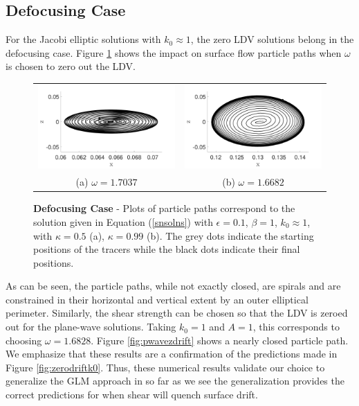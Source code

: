 \documentclass{JFM_Style/jfm}
\begin{document}
\subsection{Defocusing Case}

For the Jacobi elliptic solutions with $k_{0}\approx 1$, the zero LDV solutions belong in the defocusing case.  Figure \ref{fig:jaczerodrift} shows the impact on surface flow particle paths when $\omega$ is chosen to zero out the LDV.
\begin{figure}
\centering
\begin{tabular}{cc}
\includegraphics[width=.48\textwidth]{track_ep_pt1_tf_1_w_1pt704_kap_pt5_foc} & \includegraphics[width=.48\textwidth]{track_ep_pt1_tf_1_w_1pt668_kap_pt99_foc} \\
(a) $\omega=1.7037$ & (b) $\omega=1.6682$ 
\end{tabular}
\caption{\small {\bf Defocusing Case} - Plots of particle paths correspond to the solution given in Equation (\ref{snsolns}) with $\epsilon=0.1$, $\beta=1$, $k_{0}\approx 1$, with $\kappa=0.5$  (a), $\kappa=0.99$ (b). The grey dots indicate the starting positions of the tracers while the black dots indicate their final positions.  }
\label{fig:jaczerodrift}
\end{figure}
As can be seen, the particle paths, while not exactly closed, are spirals and are constrained in their horizontal and vertical extent by an outer elliptical perimeter.  Similarly, the shear strength can be chosen so that the LDV is zeroed out for the plane-wave solutions.  Taking $k_{0}=1$ and $A=1$, this corresponds to choosing $\omega = 1.6828$.  Figure \ref{fig:pwavezdrift} shows a nearly closed particle path.  We emphasize that these results are a confirmation of the predictions made in Figure \ref{fig:zerodriftk0}.  Thus, these numerical results validate our choice to generalize the GLM approach in so far as we see the generalization provides the correct predictions for when shear will quench surface drift.
\end{document}
